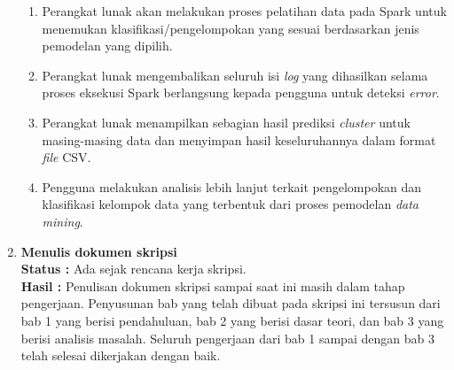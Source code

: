 \documentclass[a4paper,twoside]{article}
\begin{document}
\begin{enumerate}
\begin{enumerate}
\item Perangkat lunak akan melakukan proses pelatihan data pada Spark untuk menemukan klasifikasi/pengelompokan yang sesuai berdasarkan jenis pemodelan yang dipilih.

\item Perangkat lunak mengembalikan seluruh isi \textit{log} yang dihasilkan selama proses eksekusi Spark berlangsung kepada pengguna untuk deteksi \textit{error}.

\item Perangkat lunak menampilkan sebagian hasil prediksi \textit{cluster} untuk masing-masing data dan menyimpan hasil keseluruhannya dalam format \textit{file} CSV.

\item Pengguna melakukan analisis lebih lanjut terkait pengelompokan dan klasifikasi kelompok data yang terbentuk dari proses pemodelan \textit{data mining}.

\end{enumerate}

\item \textbf{Menulis dokumen skripsi}\\
		{\bf Status :} Ada sejak rencana kerja skripsi.\\
		{\bf Hasil :} Penulisan dokumen skripsi sampai saat ini masih dalam tahap pengerjaan. Penyusunan bab yang telah dibuat pada skripsi ini tersusun dari bab 1 yang berisi pendahuluan, bab 2 yang berisi dasar teori, dan bab 3 yang berisi analisis masalah. Seluruh pengerjaan dari bab 1 sampai dengan bab 3 telah selesai dikerjakan dengan baik. 


\end{enumerate}
\end{document}
